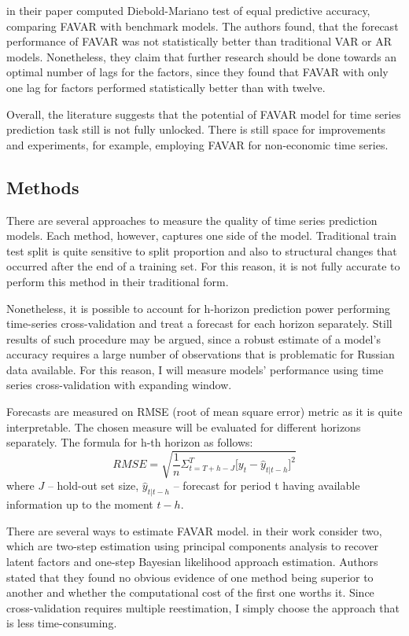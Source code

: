 \documentclass[a4paper, 14pt]{article}
\begin{document}
\cite{berggren2016can} in their paper computed Diebold-Mariano test of equal predictive accuracy, comparing FAVAR with benchmark models. The authors found, that the forecast performance of FAVAR was not statistically better than traditional VAR or AR models. Nonetheless, they claim that further research should be done towards an optimal number of lags for the factors, since they found that FAVAR with only one lag for factors performed statistically better than with twelve.  

Overall, the literature suggests that the potential of FAVAR model for time series prediction task still is not fully unlocked. There is still space for improvements and experiments, for example, employing FAVAR for non-economic time series.

\subsection{Methods}
There are several approaches to measure the quality of time series prediction models. Each method, however, captures one side of the model. Traditional train test split is quite sensitive to split proportion and also to structural changes that occurred after the end of a training set. For this reason, it is not fully accurate to perform this method in their traditional form. 

Nonetheless, it is possible to account for h-horizon prediction power performing time-series cross-validation and treat a forecast for each horizon separately. Still results of such procedure may be argued, since a robust estimate of a model's accuracy requires a large number of observations that is problematic for Russian data available. For this reason, I will measure models' performance using time series cross-validation with expanding window.

Forecasts are measured on RMSE (root of mean square error) metric
as it is quite interpretable. The chosen measure will be evaluated for different horizons separately. The formula for h-th horizon as follows:
\[
	RMSE = 
	\sqrt{
		\frac{1}{n}
		\Sigma_{t= T + h - J}^{T}
			\Big[
			y_t - \hat{y}_{t|t-h}
			\Big]^2}
\] where $J$ -- hold-out set size, $\widehat{y}_{t|t-h}$ -- forecast for period t having available information up to the moment $t-h$.


There are several ways to estimate FAVAR model. \cite{bernanke2005measuring} in their work consider two, which are two-step estimation using principal components analysis to recover latent factors and one-step Bayesian likelihood approach estimation. Authors stated that they found no obvious evidence of one method being superior to another and whether the computational cost of the first one worths it. Since cross-validation requires multiple reestimation, I simply choose the approach that is less time-consuming. 
\end{document}
